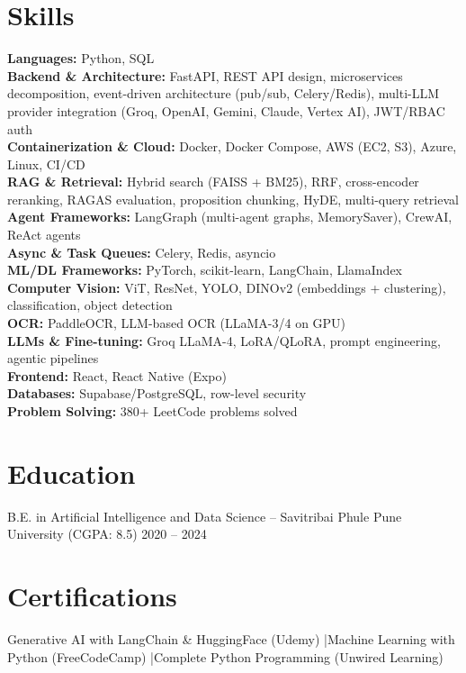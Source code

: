 \documentclass[9.5pt,a4paper]{article}
\begin{document}
\section*{Skills}
\textbf{Languages:} Python, SQL \\
\textbf{Backend \& Architecture:} FastAPI, REST API design, microservices decomposition, event-driven architecture (pub/sub, Celery/Redis), multi-LLM provider integration (Groq, OpenAI, Gemini, Claude, Vertex AI), JWT/RBAC auth \\
\textbf{Containerization \& Cloud:} Docker, Docker Compose, AWS (EC2, S3), Azure, Linux, CI/CD \\
\textbf{RAG \& Retrieval:} Hybrid search (FAISS + BM25), RRF, cross-encoder reranking, RAGAS evaluation, proposition chunking, HyDE, multi-query retrieval \\
\textbf{Agent Frameworks:} LangGraph (multi-agent graphs, MemorySaver), CrewAI, ReAct agents \\
\textbf{Async \& Task Queues:} Celery, Redis, asyncio \\
\textbf{ML/DL Frameworks:} PyTorch, scikit-learn, LangChain, LlamaIndex \\
\textbf{Computer Vision:} ViT, ResNet, YOLO, DINOv2 (embeddings + clustering), classification, object detection \\
\textbf{OCR:} PaddleOCR, LLM-based OCR (LLaMA-3/4 on GPU) \\
\textbf{LLMs \& Fine-tuning:} Groq LLaMA-4, LoRA/QLoRA, prompt engineering, agentic pipelines \\
\textbf{Frontend:} React, React Native (Expo) \\
\textbf{Databases:} Supabase/PostgreSQL, row-level security \\
\textbf{Problem Solving:} 380+ LeetCode problems solved

\section*{Education}
B.E. in Artificial Intelligence and Data Science -- Savitribai Phule Pune University (CGPA: 8.5) \hfill 2020 -- 2024

\section*{Certifications}
Generative AI with LangChain \& HuggingFace (Udemy) \quad|\quad Machine Learning with Python (FreeCodeCamp) \quad|\quad Complete Python Programming (Unwired Learning)
\end{document}
